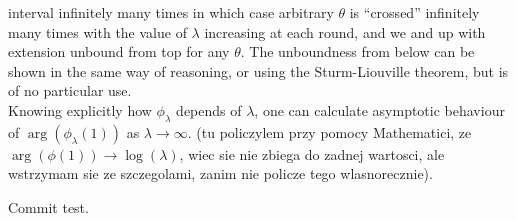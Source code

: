 \documentclass[
a4paper,%
10pt,%
titlepage,%
twoside%
]{article}
\begin{document}
interval infinitely many times in which case arbitrary $\theta$ is
``crossed'' infinitely many times with the value of $\lambda$
increasing at each round, and we and up with extension unbound from
top for any $\theta$. The unboundness from below can be shown in the
same way of reasoning, or using the Sturm-Liouville theorem, but is of
no particular use.
\\
Knowing explicitly how $\phi_\lambda$ depends of $\lambda$, one can
calculate asymptotic behaviour of $\arg(\phi_\lambda(1))$ as
$\lambda\rightarrow\infty$. (tu policzylem przy pomocy Mathematici, ze
$\arg(\phi(1))\rightarrow\log(\lambda)$, wiec sie nie zbiega do zadnej
wartosci, ale wstrzymam sie ze szczegolami, zanim nie policze tego
wlasnorecznie).


Commit test.
\end{document}
